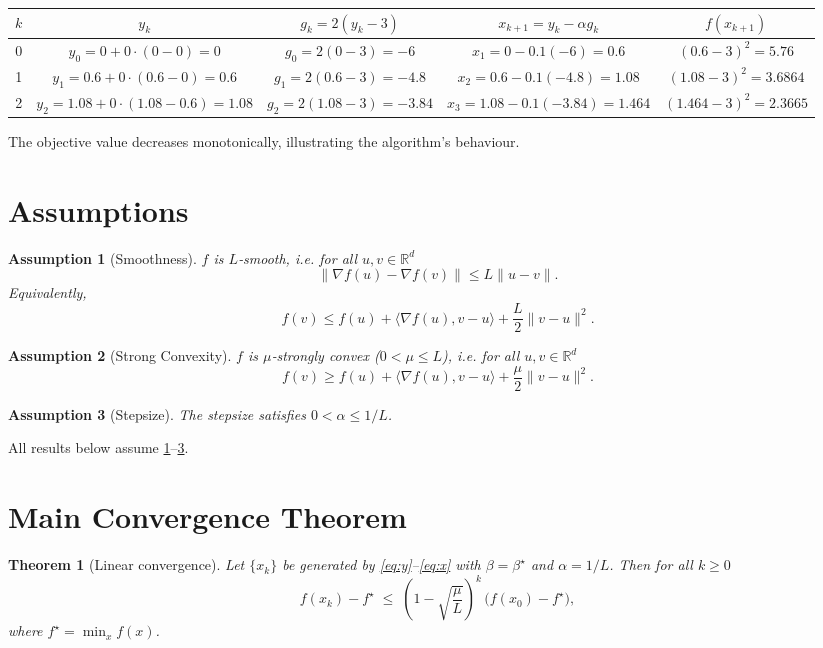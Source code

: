 \documentclass{article}
\newtheorem{theorem}{Theorem}
\newtheorem{assumption}{Assumption}
\newcommand{\R}{\mathbb{R}}
\begin{document}
\begin{center}
\begin{tabular}{c|c|c|c|c}
$k$ & $y_{k}$ & $g_{k}=2(y_{k}-3)$ & $x_{k+1}=y_{k}-\alpha g_{k}$ & $f(x_{k+1})$\\\hline
0 & $y_{0}=0+0\cdot(0-0)=0$ & $g_{0}=2(0-3)=-6$ & $x_{1}=0-0.1(-6)=0.6$ & $(0.6-3)^{2}=5.76$\\
1 & $y_{1}=0.6+0\cdot(0.6-0)=0.6$ & $g_{1}=2(0.6-3)=-4.8$ & $x_{2}=0.6-0.1(-4.8)=1.08$ & $(1.08-3)^{2}=3.6864$\\
2 & $y_{2}=1.08+0\cdot(1.08-0.6)=1.08$ & $g_{2}=2(1.08-3)=-3.84$ & $x_{3}=1.08-0.1(-3.84)=1.464$ & $(1.464-3)^{2}=2.3665$
\end{tabular}
\end{center}
The objective value decreases monotonically, illustrating the algorithm’s behaviour.

\section*{Assumptions}
\begin{assumption}[Smoothness]\label{as:smooth}
$f$ is $L$‑smooth, i.e. for all $u,v\in\R^{d}$
\[
\|\nabla f(u)-\nabla f(v)\|\le L\|u-v\|.
\]
Equivalently,
\[
f(v)\le f(u)+\langle\nabla f(u),v-u\rangle+\frac{L}{2}\|v-u\|^{2}.
\]
\end{assumption}
\begin{assumption}[Strong Convexity]\label{as:strong}
$f$ is $\mu$‑strongly convex ($0<\mu\le L$), i.e. for all $u,v\in\R^{d}$
\[
f(v)\ge f(u)+\langle\nabla f(u),v-u\rangle+\frac{\mu}{2}\|v-u\|^{2}.
\]
\end{assumption}
\begin{assumption}[Stepsize]\label{as:step}
The stepsize satisfies $0<\alpha\le 1/L$.
\end{assumption}
All results below assume \ref{as:smooth}–\ref{as:step}.

\section*{Main Convergence Theorem}
\begin{theorem}[Linear convergence]\label{thm:linear}
Let $\{x_{k}\}$ be generated by \eqref{eq:y}–\eqref{eq:x} with $\beta=\beta^{\star}$ and $\alpha=1/L$.  Then for all $k\ge 0$
\[
f(x_{k})-f^{\star}\;\le\;\left(1-\sqrt{\frac{\mu}{L}}\right)^{k}\,\bigl(f(x_{0})-f^{\star}\bigr),
\]
where $f^{\star}= \min_{x} f(x)$.
\end{theorem}
\end{document}
